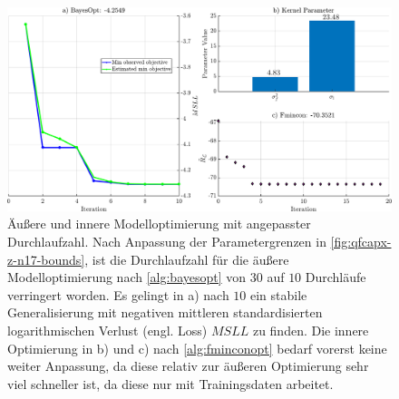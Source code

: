 \clearpage
\begin{landscape}
\begin{figure}[tbph]
	\centering
	\includegraphics[width=\linewidth]{chapters/images/4-EuOExp/QFCAPX-Z-N17-Opt}
	\caption[Äußere und innere Modelloptimierung mit angepasster Durchlaufzahl]{Äußere und innere Modelloptimierung mit angepasster Durchlaufzahl. Nach Anpassung der Parametergrenzen in \autoref{fig:qfcapx-z-n17-bounds}, ist die Durchlaufzahl für die äußere Modelloptimierung nach \autoref{alg:bayesopt} von $30$ auf $10$ Durchläufe verringert worden. Es gelingt in a) nach $10$ ein stabile Generalisierung mit negativen mittleren standardisierten logarithmischen Verlust (engl. Loss) $MSLL$ zu finden. Die innere Optimierung in b) und c) nach \autoref{alg:fminconopt} bedarf vorerst keine weiter Anpassung, da diese relativ zur äußeren Optimierung sehr viel schneller ist, da diese nur mit Trainingsdaten arbeitet.}
	\label{fig:qfcapx-z-n17-opt}
\end{figure}
\end{landscape}


\clearpage

